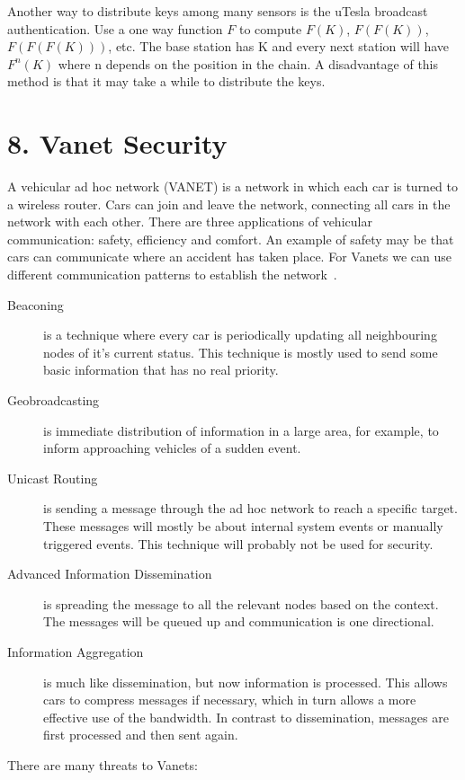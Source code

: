 \documentclass{article}
\begin{document}
Another way to distribute keys among many sensors is the uTesla broadcast authentication. Use a one way function $F$ to compute $F(K)$, $F(F(K))$, $F(F(F(K)))$, etc. The base station has K and every next station will have $F^{n}(K)$ where n depends on the position in the chain. A disadvantage of this method is that it may take a while to distribute the keys.

\newpage
\section*{8. Vanet Security}
A vehicular ad hoc network (VANET) is a network in which each car is turned to a wireless router. Cars can join and leave the network, connecting all cars in the network with each other. There are three applications of vehicular communication: safety, efficiency and comfort. An example of safety may be that cars can communicate where an accident has taken place. For Vanets we can use different communication patterns to establish the network~\cite{schoch2008communication}.

\begin{description}
\item[Beaconing] is a technique where every car is periodically updating all neighbouring nodes of it's current status. This technique is mostly used to send some basic information that has no real priority.
\item[Geobroadcasting] is immediate distribution of information in a large area, for example, to inform approaching vehicles of a sudden event.
\item[Unicast Routing] is sending a message through the ad hoc network to reach a specific target. These messages will mostly be about internal system events or manually triggered events. This technique will probably not be used for security.
\item[Advanced Information Dissemination] is spreading the message to all the relevant nodes based on the context. The messages will be queued up and communication is one directional.
\item[Information Aggregation] is much like dissemination, but now information is processed. This allows cars to compress messages if necessary, which in turn allows a more effective use of the bandwidth. In contrast to dissemination, messages are first processed and then sent again.
\end{description}

There are many threats to Vanets:
\end{document}
